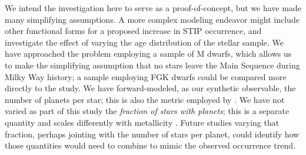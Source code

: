 \documentclass[twocolumn]{aastex631}
\begin{document}
We intend the investigation here to serve as a proof-of-concept, but we have made many simplifying assumptions. A more complex modeling endeavor might include other functional forms for a proposed increase in STIP occurrence, and investigate the effect of varying the age distribution of the stellar sample. We have approached the problem employing a sample of M dwarfs, which allows us to make the simplifying assumption that no stars leave the Main Sequence during Milky Way history; a sample employing FGK dwarfs could be compared more directly to the \cite{zink_scaling_2023} study. We have forward-modeled, as our synthetic observable, the number of planets per star; this is also the metric employed by \cite{zink_scaling_2023}. We have not varied as part of this study the \textit{fraction of stars with planets}; this is a separate quantity and scales differently with metallicity \citep{zhu_influence_2019}. Future studies varying that fraction, perhaps jointing with the number of stars per planet, could identify how those quantities would need to combine to mimic the observed occurrence trend. 




\end{document}
